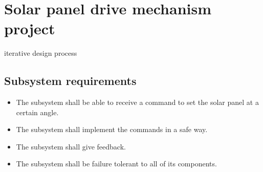 \section{Solar panel drive mechanism project}

iterative design process



\subsection{Subsystem requirements}


\begin{itemize}
    \item The subsystem shall be able to receive a command to set the solar panel at a certain angle.
    \item The subsystem shall implement the commands in a safe way.
    \item The subsystem shall give feedback. 
    \item The subsystem shall be failure tolerant to all of its components.
\end{itemize}